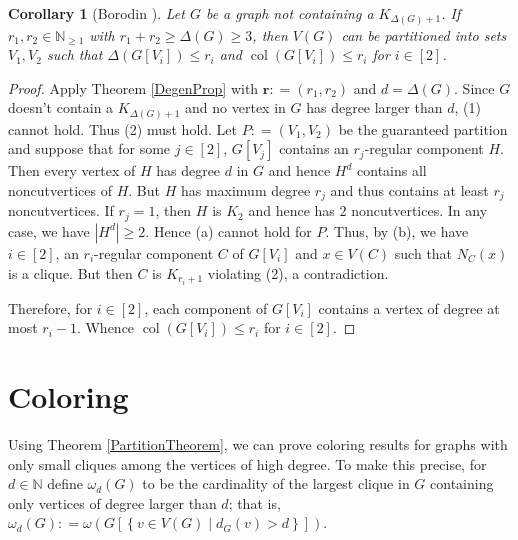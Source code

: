 \documentclass[12pt]{amsart}
\theoremstyle{plain}
\newtheorem{cor}[thm]{Corollary}
\theoremstyle{definition}
\theoremstyle{remark}
\newcommand{\IN}{\mathbb{N}}
\newcommand{\setbs}[2]{\left\{ #1 \mid #2 \right\}}
\newcommand{\card}[1]{\left|#1\right|}
\newcommand{\irange}[1]{\left[#1\right]}
\newcommand{\parens}[1]{\left( #1 \right)}
\newcommand{\brackets}[1]{\left[ #1 \right]}
\newcommand{\DefinedAs}{\mathrel{\mathop:}=}
\newcommand{\mov}[2]{#1^{#2}}
\renewcommand{\vec}[1]{\mathbf{#1}}
\begin{document}
		\begin{cor}[Borodin \cite{borodin1976decomposition}]
		Let $G$ be a graph not containing a $K_{\Delta(G) + 1}$. If $r_1, r_2 \in
		\IN_{\geq 1}$ with $r_1 + r_2 \geq \Delta(G) \geq 3$, then $V(G)$ can be 
		partitioned into sets $V_1, V_2$ such that $\Delta(G[V_i]) \leq r_i$ and $\operatorname{col}(G[V_i]) \leq r_i$ for $i \in \irange{2}$.
		\end{cor}
		\begin{proof}
		Apply Theorem \ref{DegenProp} with $\vec{r} \DefinedAs \parens{r_1, r_2}$
		and $d = \Delta(G)$.  Since $G$ doesn't contain a $K_{\Delta(G) + 1}$ and no
		vertex in $G$ has degree larger than $d$, (1) cannot hold.  Thus (2) must
		hold.  Let $P \DefinedAs (V_1, V_2)$ be the guaranteed partition and suppose
		that for some $j \in \irange{2}$, $G[V_j]$ contains an $r_j$-regular component
		$H$.  Then every vertex of $H$ has degree $d$ in $G$ and
		hence $\mov{H}{d}$ contains all noncutvertices of $H$.  But $H$ has maximum
		degree $r_j$ and thus contains at least $r_j$ noncutvertices.  If $r_j = 1$, then $H$ is $K_2$ and hence has $2$ noncutvertices. In any case,
		we have $\card{\mov{H}{d}} \geq 2$.  Hence (a) cannot hold for $P$.  Thus, by (b),
		we have $i \in \irange{2}$, an $r_i$-regular component $C$ of $G[V_i]$ and $x
		\in V(C)$ such that $N_C(x)$ is a clique.  But then $C$ is $K_{r_i + 1}$
		violating (2), a contradiction.
		
		Therefore, for $i \in \irange{2}$, each component of $G[V_i]$ contains a
		vertex of degree at most $r_i - 1$.  Whence $\operatorname{col}(G[V_i]) \leq r_i$ for
		$i \in \irange{2}$.
		\end{proof}

	\section{Coloring}
	Using Theorem \ref{PartitionTheorem}, we can prove coloring results for graphs
	with only small cliques among the vertices of high degree. To make this
	precise, for $d \in \IN$ define $\omega_d(G)$ to be the cardinality of the largest
	clique in $G$ containing only vertices of degree larger than $d$; that is, $\omega_d(G)
	\DefinedAs \omega\parens{G\brackets{\setbs{v \in V(G)}{d_G(v) > d}}}$.
	
\end{document}

